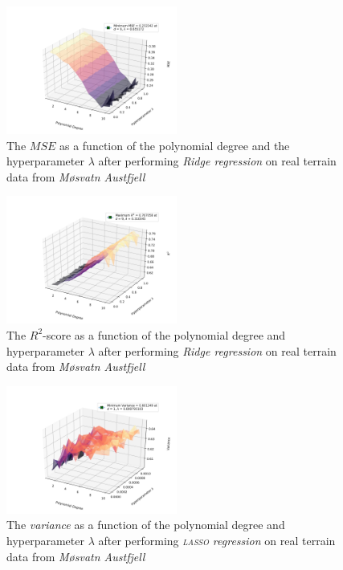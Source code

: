 \documentclass[a4paper,10pt,english]{article}
\begin{document}
\begin{figure}[H]
	\centering 
	\includegraphics[width = 0.5\textwidth, center]{../real_output/part_D_2.png}
	\caption{The $MSE$ as a function of the polynomial degree and the hyperparameter $\lambda$ after performing \textit{Ridge regression} on real terrain data from \textit{Møsvatn Austfjell}}
	\label{fig_20}
\end{figure}

\begin{figure}[H]
	\centering 
	\includegraphics[width = 0.5\textwidth, center]{../real_output/part_D_3.png}
	\caption{The $R^2$-score as a function of the polynomial degree and hyperparameter $\lambda$ after performing \textit{Ridge regression} on real terrain data from \textit{Møsvatn Austfjell}}
	\label{fig_21}
\end{figure}

\begin{figure}[H]
	\centering 
	\includegraphics[width = 0.5\textwidth, center]{../real_output/part_E_1.png}
	\caption{The \textit{variance} as a function of the polynomial degree and hyperparameter $\lambda$ after performing \textit{\textsc{lasso} regression} on real terrain data from \textit{Møsvatn Austfjell}}
	\label{fig_22}
\end{figure}
\end{document}
